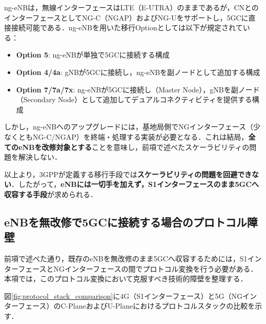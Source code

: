 ng-eNBは，無線インターフェースはLTE（E-UTRA）のままであるが，CNとのインターフェースとしてNG-C（NGAP）およびNG-Uをサポートし，5GCに直接接続可能である\cite{3GPP_TS38300}．ng-eNBを用いた移行Optionとしては以下が規定されている：
\begin{itemize}
  \item \textbf{Option 5}: ng-eNBが単独で5GCに接続する構成
  \item \textbf{Option 4/4a}: gNBが5GCに接続し，ng-eNBを副ノードとして追加する構成
  \item \textbf{Option 7/7a/7x}: ng-eNBが5GCに接続し（Master Node），gNBを副ノード（Secondary Node）として追加してデュアルコネクティビティを提供する構成
\end{itemize}

しかし，ng-eNBへのアップグレードには，基地局側でNGインターフェース（少なくともNG-C/NGAP）を終端・処理する実装が必要となる．これは結局，\textbf{全てのeNBを改修対象とする}ことを意味し，前項で述べたスケーラビリティの問題を解決しない．

以上より，3GPPが定義する移行手段では\textbf{スケーラビリティの問題を回避できない}．したがって，\textbf{eNBには一切手を加えず，S1インターフェースのまま5GCへ収容する手段}が求められる．

\subsection{eNBを無改修で5GCに接続する場合のプロトコル障壁}
\label{sec:protocol_barriers}

前項で述べた通り，既存のeNBを無改修のまま5GCへ収容するためには，S1インターフェースとNGインターフェースの間でプロトコル変換を行う必要がある．本項では，このプロトコル変換において克服すべき技術的障壁を整理する．

図\ref{fig:protocol_stack_comparison}に4G（S1インターフェース）と5G（NGインターフェース）のC-PlaneおよびU-Planeにおけるプロトコルスタックの比較を示す．

